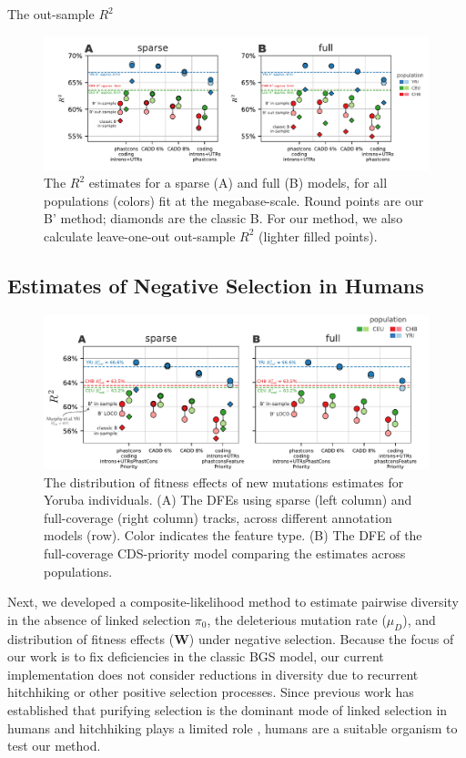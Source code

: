 \documentclass[11pt]{article}
\begin{document}
The out-sample $R^2$ 

\begin{figure}[htbp] \centering
    \includegraphics[width=\textwidth]{figures/figure_2.pdf} 
    \caption{The $R^2$ estimates for a sparse (A) and full (B) models, for all 
    populations (colors) fit at the megabase-scale. Round points are our B' 
    method; diamonds are the classic B. For our method, we also calculate 
    leave-one-out out-sample $R^2$ (lighter filled points).}
  \label{fig:figure-2}
\end{figure}

\subsection*{Estimates of Negative Selection in Humans}

\begin{figure}[htbp] \centering
    \includegraphics[width=\textwidth]{figures/figure_3.pdf} 
    \caption{The distribution of fitness effects of new mutations estimates for
        Yoruba individuals. (A) The DFEs using sparse (left column) and
        full-coverage (right column) tracks, across different annotation models
        (row). Color indicates the feature type. (B) The DFE of the
        full-coverage CDS-priority model comparing the estimates across
    populations.}
  \label{fig:figure-3}
\end{figure}



Next, we developed a composite-likelihood method to estimate pairwise diversity
in the absence of linked selection $\pi_0$, the deleterious mutation rate
($\mu_D$), and distribution of fitness effects ($\mathbf{W}$) under negative
selection. Because the focus of our work is to fix deficiencies in the classic
BGS model, our current implementation does not consider reductions in diversity
due to recurrent hitchhiking or other positive selection processes. Since
previous work has established that purifying selection is the dominant mode of
linked selection in humans and hitchhiking plays a limited role
\parencite{McVicker2009-ax,Murphy2022-sj}, humans are a suitable organism to
test our method. 
\end{document}
